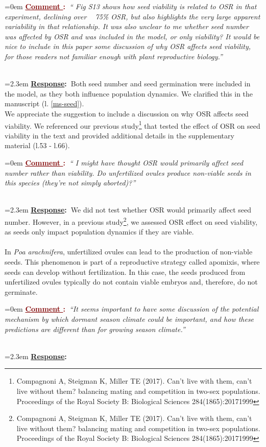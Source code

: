 \documentclass[12pt]{article}
\newcounter{cN}
\newcommand{\comment}[1]{
	\vspace{2em}
	\refstepcounter{cN} %
	\noindent \hangindent=0em \textbf{\textcolor{Maroon}{\uline{Comment \thecN}:~}}\emph{``#1''}
	}
\newcommand{\response}[1]{
	\\[0.25em]
	\hangindent=2.3em \textbf{\textcolor{NavyBlue}{\uline{Response}:~}}#1
	}
\begin{document}
\comment{ Fig S13 shows how seed viability is related to OSR in that experiment, declining over ~ 75\% OSR, but also highlights
the very large apparent variability in that relationship. It was also unclear to me whether seed number was affected by OSR and was included in the model, or only
viability? It would be nice to include in this paper some discussion of why OSR affects seed viability, for those readers not familiar enough with plant reproductive
biology.}
\response{Both seed number and seed germination were included in the model, as they both influence population dynamics. 
We clarified this in the manuscript (l. \ref{ms-seed}).
\\
We appreciate the suggestion to include a discussion on why OSR affects seed viability.
We referenced our previous study\footnote{Compagnoni A, Steigman K, Miller TE (2017). Can’t live with them, can’t live without them? balancing mating and competition in two-sex populations. Proceedings of the Royal Society B: Biological Sciences 284(1865):20171999} that tested the effect of OSR on seed viability in the text and provided additional details in the supplementary material (l.53 - l.66).}

\comment{ I might have thought OSR would primarily affect seed number rather than viability. Do unfertilized ovules produce non-viable seeds in this species (they’re not simply aborted)?}
\response{We did not test whether OSR would primarily affect seed number. 
However, in a previous study\footnote{Compagnoni A, Steigman K, Miller TE (2017). Can’t live with them, can’t live without them? balancing mating and competition in two-sex populations. Proceedings of the Royal Society B: Biological Sciences 284(1865):20171999}, we assessed OSR  effect on seed viability, as seeds only impact population dynamics if they are viable. 
\\
\\
In \emph{Poa arachnifera}, unfertilized ovules can lead to the production of non-viable seeds. This phenomenon is part of a reproductive strategy called apomixis, where seeds can develop without fertilization. In this case, the seeds produced from unfertilized ovules typically do not contain viable embryos and, therefore, do not germinate.}

\comment{It seems important to have some discussion of the potential mechanism by which dormant season climate could be important, and how these predictions are
different than for growing season climate.}
\response{}
\end{document}
